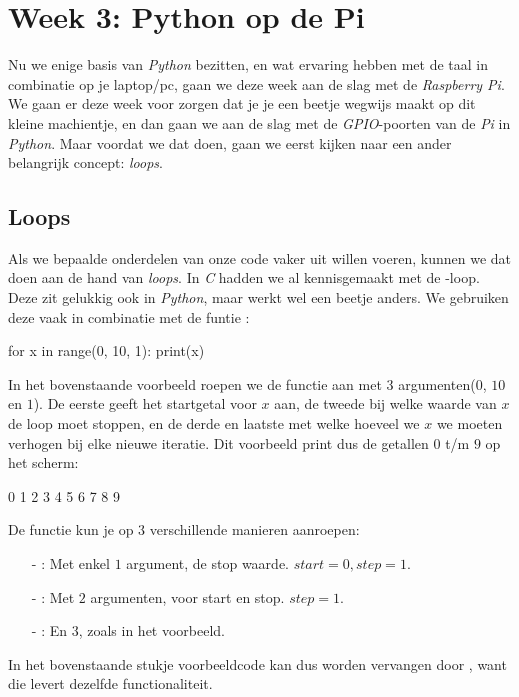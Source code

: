 \chapter{Week 3: Python op de Pi}

Nu we enige basis van \textit{Python} bezitten, en wat ervaring hebben met de taal in combinatie op je laptop/pc, gaan we deze week aan de slag met de \textit{Raspberry Pi}. We gaan er deze week voor zorgen dat je je een beetje wegwijs maakt op dit kleine machientje, en dan gaan we aan de slag met de \textit{GPIO}-poorten van de \textit{Pi} in \textit{Python}. Maar voordat we dat doen, gaan we eerst kijken naar een ander belangrijk concept: \textit{loops}. 

\section{Loops}
Als we bepaalde onderdelen van onze code vaker uit willen voeren, kunnen we dat doen aan de hand van \textit{loops}. In \textit{C} hadden we al kennisgemaakt met de -loop. Deze zit gelukkig ook in \textit{Python}, maar werkt wel een beetje anders. We gebruiken deze vaak in combinatie met de funtie :
\begin{python}
for x in range(0, 10, 1):
	print(x)
\end{python}
In het bovenstaande voorbeeld roepen we de functie  aan met 3 argumenten($0$, $10$ en $1$). De eerste geeft het startgetal voor $x$ aan, de tweede bij welke waarde van $x$ de loop moet stoppen, en de derde en laatste met welke hoeveel we $x$ we moeten verhogen bij elke nieuwe iteratie. Dit voorbeeld print dus de getallen $0$ t/m $9$ op het scherm:
\begin{python}
0
1
2
3
4
5
6
7
8
9
\end{python}

\begin{remark}
De functie  kun je op $3$ verschillende manieren aanroepen:
\begin{enumerate}
\item[-] : Met enkel $1$ argument, de stop waarde. $start=0, step=1$.
\item[-] : Met $2$ argumenten, voor start en stop. $step=1$.
\item[-] : En $3$, zoals in het voorbeeld.
\end{enumerate}
In het bovenstaande stukje voorbeeldcode kan dus  worden vervangen door , want die levert dezelfde functionaliteit.
\end{remark}

